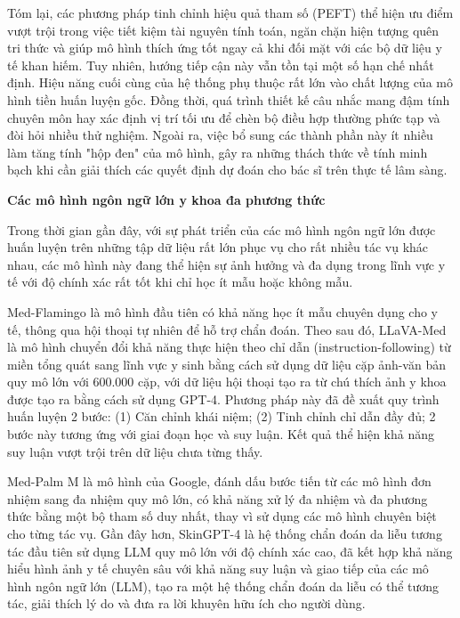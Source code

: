   Tóm lại, các phương pháp tinh chỉnh hiệu quả tham số (PEFT) thể hiện ưu điểm vượt trội trong việc tiết kiệm tài nguyên tính toán, ngăn chặn hiện tượng quên tri thức và giúp mô hình thích ứng tốt ngay cả khi đối mặt với các bộ dữ liệu y tế khan hiếm. Tuy nhiên, hướng tiếp cận này vẫn tồn tại một số hạn chế nhất định. Hiệu năng cuối cùng của hệ thống phụ thuộc rất lớn vào chất lượng của mô hình tiền huấn luyện gốc. Đồng thời, quá trình thiết kế câu nhắc mang đậm tính chuyên môn hay xác định vị trí tối ưu để chèn bộ điều hợp thường phức tạp và đòi hỏi nhiều thử nghiệm. Ngoài ra, việc bổ sung các thành phần này ít nhiều làm tăng tính "hộp đen" của mô hình, gây ra những thách thức về tính minh bạch khi cần giải thích các quyết định dự đoán cho bác sĩ trên thực tế lâm sàng.
              
  \textbf{Các mô hình ngôn ngữ lớn y khoa đa phương thức}

  Trong thời gian gần đây, với sự phát triển của các mô hình ngôn ngữ lớn được huấn luyện trên những tập dữ liệu rất lớn phục vụ cho rất nhiều tác vụ khác nhau, các mô hình này đang thể hiện sự ảnh hưởng và đa dụng trong lĩnh vực y tế với độ chính xác rất tốt khi chỉ học ít mẫu hoặc không mẫu.

  Med-Flamingo \cite{moor_2023_medflamingo} là mô hình đầu tiên có khả năng học ít mẫu chuyên dụng cho y tế, thông qua hội thoại tự nhiên để hỗ trợ chẩn đoán. Theo sau đó, LLaVA-Med \cite{li_2023_llavamed} là mô hình chuyển đổi khả năng thực hiện theo chỉ dẫn (instruction-following) từ miền tổng quát sang lĩnh vực y sinh bằng cách sử dụng dữ liệu cặp ảnh-văn bản quy mô lớn với 600.000 cặp, với dữ liệu hội thoại tạo ra từ chú thích ảnh y khoa được tạo ra bằng cách sử dụng GPT-4. Phương pháp này đã đề xuất quy trình huấn luyện 2 bước: (1) Căn chỉnh khái niệm; (2) Tinh chỉnh chỉ dẫn đầy đủ; 2 bước này tương ứng với giai đoạn học và suy luận. Kết quả thể hiện khả năng suy luận vượt trội trên dữ liệu chưa từng thấy. 

  Med-Palm M \cite{MED-PALM-M} là mô hình của Google, đánh dấu bước tiến từ các mô hình đơn nhiệm sang đa nhiệm quy mô lớn, có khả năng xử lý đa nhiệm và đa phương thức bằng một bộ tham số duy nhất, thay vì sử dụng các mô hình chuyên biệt cho từng tác vụ. Gần đây hơn, SkinGPT-4 \cite{SkinGPT-4} là hệ thống chẩn đoán da liễu tương tác đầu tiên sử dụng LLM quy mô lớn với độ chính xác cao, đã kết hợp khả năng hiểu hình ảnh y tế chuyên sâu với khả năng suy luận và giao tiếp của các mô hình ngôn ngữ lớn (LLM), tạo ra một hệ thống chẩn đoán da liễu có thể tương tác, giải thích lý do và đưa ra lời khuyên hữu ích cho người dùng.

